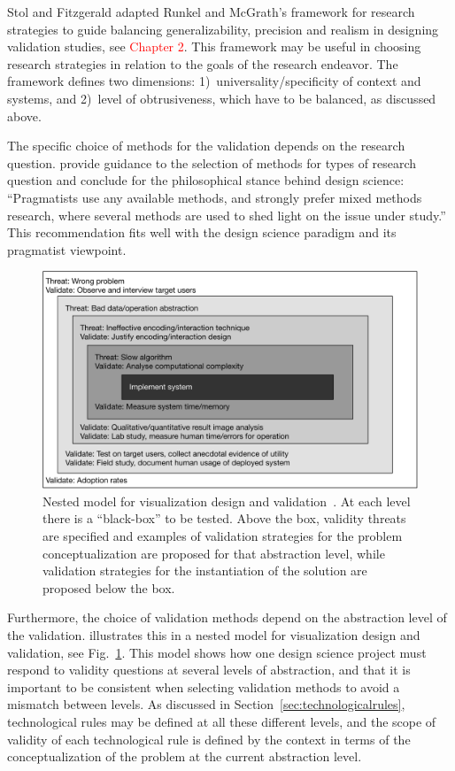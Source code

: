 \documentclass[graybox]{svmult}
\begin{document}
Stol and Fitzgerald adapted Runkel and McGrath's framework for research strategies to guide balancing generalizability, precision and realism in designing validation studies, see \textcolor{red}{Chapter 2}. This framework may be useful in choosing research strategies in relation to the goals of the research endeavor. The framework defines two dimensions: 1)~universality/specificity of context and systems, and 2)~level of obtrusiveness, which have to be balanced, as discussed above. 

The specific choice of methods for the validation depends on the research question. \cite{easterbrook_selecting_2008}  provide guidance to the selection of methods for types of research question and conclude for the philosophical stance behind design science: ``Pragmatists use any available methods, and strongly prefer mixed methods research, where several methods are used to shed light on the issue under study.''
This recommendation fits well with the design science paradigm and its pragmatist viewpoint.

\begin{figure}[t]
  \includegraphics[width=\textwidth]{05_Runeson_DesignScience_Fig_3.pdf}
\caption{Nested model for visualization design and validation~\citep{munzner2009}. At each level there is a ``black-box'' to be tested. Above the box, validity threats are specified and examples of validation strategies for the problem conceptualization are proposed for that abstraction level, while validation strategies for the instantiation of the solution are proposed below the box.}\label{fig:nested_model}       
\end{figure} 

Furthermore, the choice of validation methods depend on the abstraction level of the validation. \cite{munzner2009} illustrates this in a nested model for visualization design and validation, see Fig.~\ref{fig:nested_model}. This model shows how one design science project must respond to validity questions at several levels of abstraction, and that it is important to be consistent when selecting validation methods to avoid a mismatch between levels. As discussed in Section~\ref{sec:technologicalrules}, technological rules may be defined at all these different levels, and the scope of validity of each technological rule is defined by the context in terms of the conceptualization of the problem at the current abstraction level.
\end{document}
